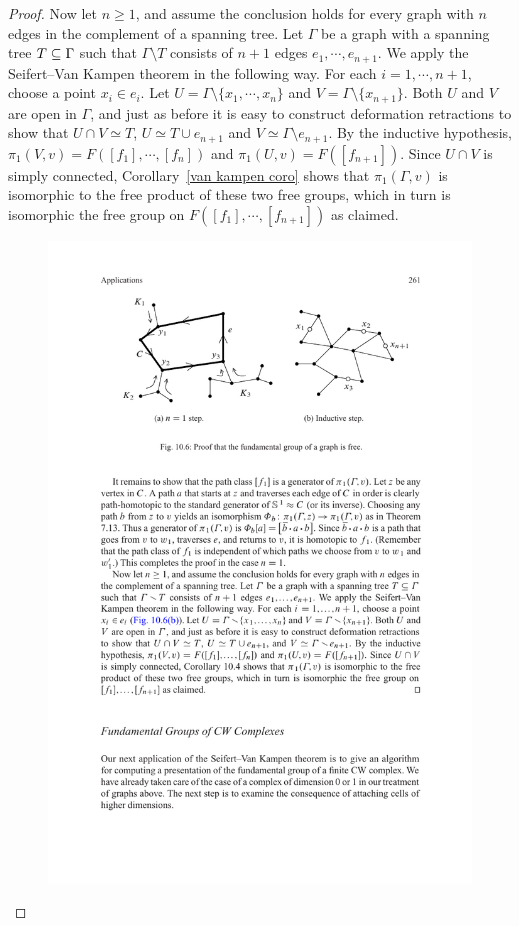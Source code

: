 \begin{proof}
Now let $n\geq1$, and assume the conclusion holds for every graph with $n$ edges in
the complement of a spanning tree. Let $\Gamma$ be a graph with a spanning tree $T\subseteq\Gamma$ such that $\Gamma\setminus T$ consists of $n+1$ edges $e_1,\cdots,e_{n+1}$. We apply the Seifert–Van Kampen theorem in the following way. For each $i=1,\cdots,n+1$, choose a point $x_i\in e_i$. Let $U=\Gamma\setminus\{x_1,\cdots,x_n\}$ and $V=\Gamma\setminus\{x_{n+1}\}$. Both $U$ and
$V$ are open in $\Gamma$, and just as before it is easy to construct deformation retractions to show that $U\cap V\simeq T$, $U\simeq T\cup e_{n+1}$ and $V\simeq\Gamma\setminus e_{n+1}$. By the inductive hypothesis, $\pi_1(V,v)=F([f_1],\cdots,[f_n])$ and $\pi_1(U,v)=F([f_{n+1}])$. Since $U\cap V$ is simply connected, Corollary~\ref{van kampen coro} shows that $\pi_1(\Gamma,v)$ is isomorphic to the free product of these two free groups, which in turn is isomorphic the free group on $F([f_1],\cdots,[f_{n+1}])$ as claimed.
\begin{figure}[htbp]
\centering
\includegraphics{fandamental-graph-2}
\end{figure}
\end{proof}
